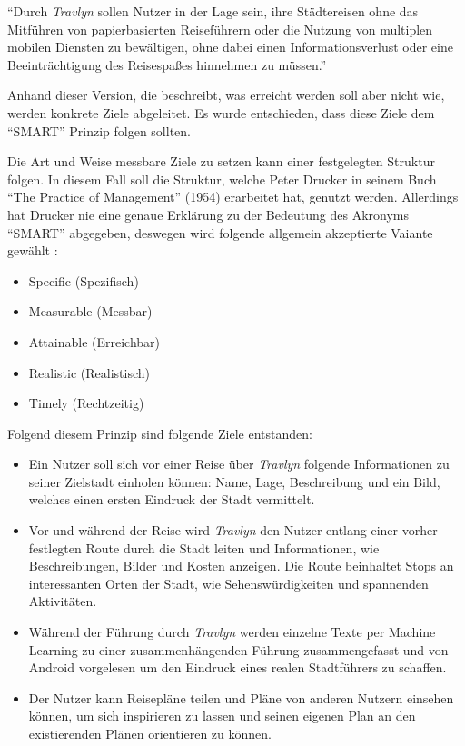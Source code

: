 \enquote{Durch \textit{Travlyn} sollen Nutzer in der Lage sein, ihre Städtereisen ohne das Mitführen von papierbasierten Reiseführern oder die Nutzung von multiplen mobilen Diensten zu bewältigen, ohne dabei einen Informationsverlust oder eine Beeinträchtigung des Reisespaßes hinnehmen zu müssen.}

\vspace{0.25cm}

Anhand dieser Version, die beschreibt, was erreicht werden soll aber nicht wie, werden konkrete Ziele abgeleitet. Es wurde entschieden, dass diese Ziele dem \enquote{SMART} Prinzip folgen sollten.

\begin{defStrich}
	Die Art und Weise messbare Ziele zu setzen kann einer festgelegten Struktur folgen. In diesem Fall soll die Struktur, welche Peter Drucker in seinem Buch \enquote{The Practice of Management} (1954) erarbeitet hat, genutzt werden. Allerdings hat Drucker nie eine genaue Erklärung zu der Bedeutung des Akronyms \enquote{SMART} abgegeben, deswegen wird folgende allgemein akzeptierte Vaiante gewählt \cite{Lawlor.2012}:
	\begin{itemize}
		\item Specific (Spezifisch)
		\item Measurable (Messbar)
		\item Attainable (Erreichbar)
		\item Realistic (Realistisch)
		\item Timely (Rechtzeitig)
	\end{itemize}   
\end{defStrich} 

Folgend diesem Prinzip sind folgende Ziele entstanden:

\begin{itemize}
	\item Ein Nutzer soll sich vor einer Reise über \textit{Travlyn} folgende Informationen zu seiner Zielstadt einholen können: Name, Lage, Beschreibung und ein Bild, welches einen ersten Eindruck der Stadt vermittelt.
	\item Vor und während der Reise wird \textit{Travlyn} den Nutzer entlang einer vorher festlegten Route durch die Stadt leiten und Informationen, wie Beschreibungen, Bilder und Kosten anzeigen. Die Route beinhaltet Stops an interessanten Orten der Stadt, wie Sehenswürdigkeiten und spannenden Aktivitäten.
	\item Während der Führung durch \textit{Travlyn} werden einzelne Texte per Machine Learning zu einer zusammenhängenden Führung zusammengefasst und von Android vorgelesen um den Eindruck eines realen Stadtführers zu schaffen.
	\item Der Nutzer kann Reisepläne teilen und Pläne von anderen Nutzern einsehen können, um sich inspirieren zu lassen und seinen eigenen Plan an den existierenden Plänen orientieren zu können. 
\end{itemize}

